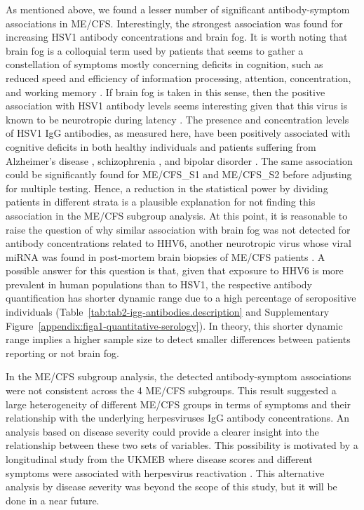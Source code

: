 As mentioned above, we found a lesser number of significant antibody-symptom associations in ME/CFS. Interestingly, the strongest association was found for increasing HSV1 antibody concentrations and brain fog. It is worth noting that brain fog is a colloquial term used by patients that seems to gather a constellation of symptoms mostly concerning deficits in cognition, such as reduced speed and efficiency of information processing, attention, concentration, and working memory \citep{ross2013WhatBrain, ocon2013CaughtThickness, krishnan2022MultidisciplinaryApproach}. If brain fog is taken in this sense, then the positive association with HSV1 antibody levels seems interesting given that this virus is known to be neurotropic during latency \citep{marcocci2020HerpesSimplex}. The presence and concentration levels of HSV1 IgG antibodies, as measured here, have been positively associated with cognitive deficits in both healthy individuals \citep{jonker2014AssociationExposure, tarter2014PersistentViral, fruchter2015ImpactHerpes} and patients suffering from Alzheimer's disease \citep{murphy2021HerpesSimplex}, schizophrenia \citep{dickerson2020AssociationExposure}, and bipolar disorder \citep{tucker2019AssessmentCognitive}. The same association could be significantly found for ME/CFS\_S1 and ME/CFS\_S2 before adjusting for multiple testing. Hence, a reduction in the statistical power by dividing patients in different strata is a plausible explanation for not finding this association in the ME/CFS subgroup analysis. At this point, it is reasonable to raise the question of why similar association with brain fog was not detected for antibody concentrations related to HHV6, another neurotropic virus whose viral miRNA was found in post-mortem brain biopsies of ME/CFS patients \citep{kasimir2022TissueSpecific}. A possible answer for this question is that, given that exposure to HHV6 is more prevalent in human populations than to HSV1, the respective antibody quantification has shorter dynamic range due to a high percentage of seropositive individuals (Table~\ref{tab:tab2-igg-antibodies.description} and Supplementary Figure~\ref{appendix:figa1-quantitative-serology}). In theory, this shorter dynamic range implies a higher sample size to detect smaller differences between patients reporting or not brain fog.

In the ME/CFS subgroup analysis, the detected antibody-symptom associations were not consistent across the 4 ME/CFS subgroups. This result suggested a large heterogeneity of different ME/CFS groups in terms of symptoms and their relationship with the underlying herpesviruses IgG antibody concentrations. An analysis based on disease severity could provide a clearer insight into the relationship between these two sets of variables. This possibility is motivated by a longitudinal study from the UKMEB where disease scores and different symptoms were associated with herpesvirus reactivation \citep{lee2021SalivaryDNA}. This alternative analysis by disease severity was beyond the scope of this study, but it will be done in a near future.

